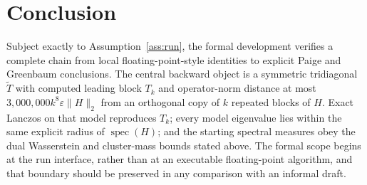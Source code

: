 \documentclass[11pt]{article}
\newcommand{\norm}[1]{\lVert #1\rVert_2}
\newcommand{\spec}{\operatorname{spec}}
\theoremstyle{definition}
\begin{document}
\section{Conclusion}

Subject exactly to Assumption~\ref{ass:run}, the formal development verifies a
complete chain from local floating-point-style identities to explicit Paige
and Greenbaum conclusions.  The central backward object is a symmetric
tridiagonal $\widetilde T$ with computed leading block $T_k$ and operator-norm
distance at most
$3{,}000{,}000k^8\varepsilon\norm H$ from an orthogonal copy of $k$ repeated
blocks of $H$.  Exact Lanczos on that model reproduces $T_k$; every model
eigenvalue lies within the same explicit radius of $\spec(H)$; and the
starting spectral measures obey the dual Wasserstein and cluster-mass bounds
stated above.  The formal scope begins at the run interface, rather than at an
executable floating-point algorithm, and that boundary should be preserved in
any comparison with an informal draft.
\end{document}
